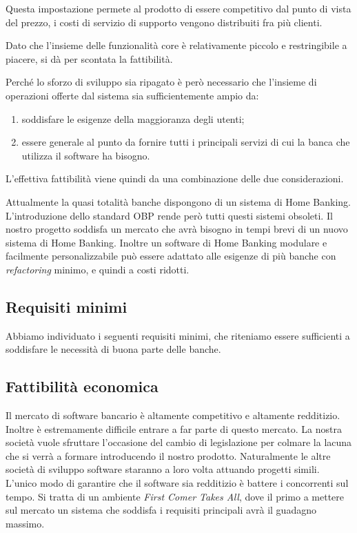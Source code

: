 \documentclass[10pt]{softeng} %
\begin{document}
Questa impostazione permete al prodotto di essere competitivo dal punto di vista del prezzo, i costi di servizio di supporto vengono distribuiti fra pi\`u clienti. 

Dato che l'insieme delle funzionalit\`a core \`e relativamente piccolo e restringibile a piacere, si d\`a per scontata la fattibilit\`a.

Perch\'e lo sforzo di sviluppo sia ripagato \`e per\`o necessario che l'insieme di operazioni offerte dal sistema sia sufficientemente ampio da:
\begin{enumerate}
	\item soddisfare le esigenze della maggioranza degli utenti;
	\item essere generale al punto da fornire tutti i principali servizi di cui la banca che utilizza il software ha bisogno.
\end{enumerate}
L'effettiva fattibilit\`a viene quindi da una combinazione delle due considerazioni.

Attualmente la quasi totalit\`a banche dispongono di un sistema di Home Banking.
L'introduzione dello standard OBP rende per\`o tutti questi sistemi obsoleti.
Il nostro progetto soddisfa un mercato che avr\`a bisogno in tempi brevi di un nuovo sistema di Home Banking.
Inoltre un software di Home Banking modulare e facilmente personalizzabile pu\`o essere adattato alle esigenze di pi\`u banche con \emph{refactoring} minimo, e quindi a costi ridotti.

\subsection{Requisiti minimi}

Abbiamo individuato i seguenti requisiti minimi, che riteniamo essere sufficienti a soddisfare le necessit\`a di buona parte delle banche.


\subsection{Fattibilit\`a economica}

Il mercato di software bancario \`e altamente competitivo e altamente redditizio.
Inoltre \`e estremamente difficile entrare a far parte di questo mercato.
La nostra societ\`a vuole sfruttare l'occasione del cambio di legislazione per colmare la lacuna che si verr\`a a formare introducendo il nostro prodotto.
Naturalmente le altre societ\`a di sviluppo software staranno a loro volta attuando progetti simili.
L'unico modo di garantire che il software sia redditizio \`e battere i concorrenti sul tempo.
Si tratta di un ambiente \emph{First Comer Takes All}, dove il primo a mettere sul mercato un sistema che soddisfa i requisiti principali avr\`a il guadagno massimo.
\end{document}
